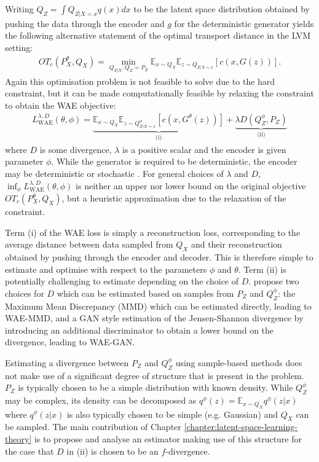 Writing $Q_Z = \int Q_{Z|X=x} q(x) dx$ to be the latent space distribution obtained by pushing the data through the encoder and $g$ for the deterministic generator yields the following alternative statement of the optimal transport distance in the LVM setting:
%
\begin{align*}
OT_c(P_X^\theta, Q_X) = \min_{Q_{Z|X}: Q_Z = P_Z} \mathbb{E}_{x\sim Q_X} \mathbb{E}_{z\sim Q_{Z|X=x}} \left[ c(x, G(z)) \right].
\end{align*}
%
Again this optimisation problem is not feasible to solve due to the hard constraint, 
but it can be made computationally feasible by relaxing the constraint to obtain the WAE objective:
%
\begin{align}
L_{\text{WAE}}^{\lambda, D}(\theta, \phi) = \underbrace{\mathbb{E}_{x\sim Q_X} \mathbb{E}_{z\sim Q^\phi_{Z|X=x}} \left[ c(x, G^\theta(z)) \right]}_{\text{(i)}} + \underbrace{\lambda D\left(Q^\phi_Z, P_Z  \right)}_{\text{(ii)}}
\end{align}
%
where $D$ is some divergence, $\lambda$ is a positive scalar and the encoder is given parameter $\phi$.
While the generator is required to be deterministic, the encoder may be deterministic or stochastic \citep{rubenstein2018latent}.
For general choices of $\lambda$ and $D$, $\inf_{\phi} L_{\text{WAE}}^{\lambda, D}(\theta, \phi)$ is neither an upper nor lower bound on the original objective $OT_c(P_X^\theta, Q_X)$, but a heuristic approximation due to the relaxation of the constraint. 


Term (i) of the WAE loss is simply a reconstruction loss, corresponding to the average distance between data sampled from $Q_X$ and their reconstruction obtained by pushing through the encoder and decoder.
This is therefore simple to estimate and optimise with respect to the parameters $\phi$ and $\theta$.
Term (ii) is potentially challenging to estimate depending on the choice of $D$. 
\cite{tolstikhin2017wasserstein} propose two choices for $D$ which can be estimated based on samples from $P_Z$ and $Q_Z^\phi$: the Maximum Mean Discrepancy (MMD) \citep{gretton2012kernel} which can be estimated directly, leading to WAE-MMD, and a GAN style estimation of the Jensen-Shannon divergence by introducing an additional discriminator to obtain a lower bound on the divergence, leading to WAE-GAN. 

Estimating a divergence between $P_Z$ and $Q_Z^\phi$ using sample-based methods does not make use of a significant degree of structure that is present in the problem. $P_Z$ is typically chosen to be a simple distribution with known density. While $Q_Z^\phi$ may be complex, its density can be decomposed as $q^\phi(z) = \mathbb{E}_{x\sim Q_X} q^\phi(z|x)$ where $q^\phi(z|x)$ is also typically chosen to be simple (e.g. Gaussian) and $Q_X$ can be sampled.
The main contribution of Chapter \ref{chapter:latent-space-learning-theory} is to propose and analyse an estimator making use of this structure for the case that $D$ in (ii) is chosen to be an $f$-divergence. 

